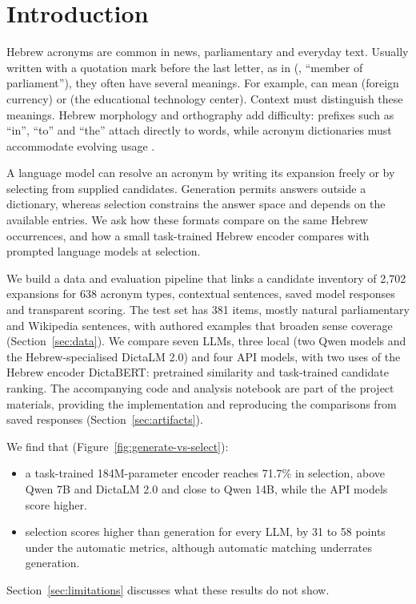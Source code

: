 \section{Introduction}
Hebrew acronyms are common in news, parliamentary and everyday text. Usually written with a quotation mark before the last letter, as in  (, ``member of parliament''), they often have several meanings. For example,  can mean  (foreign currency) or  (the educational technology center). Context must distinguish these meanings. Hebrew morphology and orthography add difficulty: prefixes such as ``in'', ``to'' and ``the'' attach directly to words, while acronym dictionaries must accommodate evolving usage \citep{jacobs2020acronyms}.

A language model can resolve an acronym by writing its expansion freely or by selecting from supplied candidates. Generation permits answers outside a dictionary, whereas selection constrains the answer space and depends on the available entries. We ask how these formats compare on the same Hebrew occurrences, and how a small task-trained Hebrew encoder compares with prompted language models at selection.

We build a data and evaluation pipeline that links a candidate inventory of 2,702 expansions for 638 acronym types, contextual sentences, saved model responses and transparent scoring. The test set has 381 items, mostly natural parliamentary and Wikipedia sentences, with authored examples that broaden sense coverage (Section~\ref{sec:data}). We compare seven LLMs, three local (two Qwen models and the Hebrew-specialised DictaLM 2.0) and four API models, with two uses of the Hebrew encoder DictaBERT: pretrained similarity and task-trained candidate ranking. The accompanying code and analysis notebook are part of the project materials, providing the implementation and reproducing the comparisons from saved responses (Section~\ref{sec:artifacts}).

We find that (Figure~\ref{fig:generate-vs-select}):
\begin{itemize}
\item a task-trained 184M-parameter encoder reaches 71.7\% in selection, above Qwen 7B and DictaLM 2.0 and close to Qwen 14B, while the API models score higher.
\item selection scores higher than generation for every LLM, by 31 to 58 points under the automatic metrics, although automatic matching underrates generation.
\end{itemize}
Section~\ref{sec:limitations} discusses what these results do not show.
